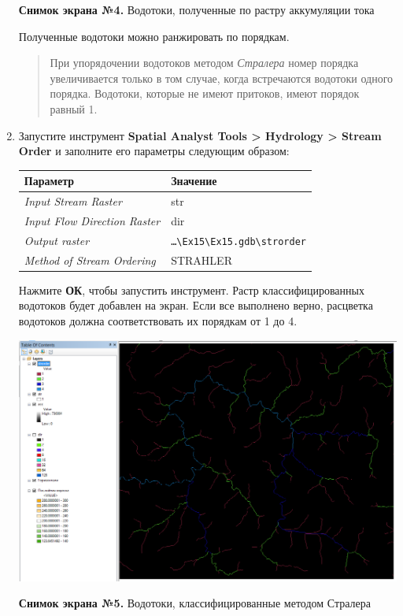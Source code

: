 \documentclass[]{book}
\theoremstyle{definition}
\theoremstyle{definition}
\theoremstyle{definition}
\theoremstyle{remark}
\begin{document}
\begin{enumerate}
  \textbf{Снимок экрана №4.} Водотоки, полученные по растру аккумуляции
  тока

  Полученные водотоки можно ранжировать по порядкам.

  \begin{quote}
  При упорядочении водотоков методом \emph{Стралера} номер порядка
  увеличивается только в том случае, когда встречаются водотоки одного
  порядка. Водотоки, которые не имеют притоков, имеют порядок равный 1.
  \end{quote}
\item
  Запустите инструмент \textbf{Spatial Analyst Tools \textgreater{}
  Hydrology \textgreater{} Stream Order} и заполните его параметры
  следующим образом:

  \begin{longtable}[]{@{}ll@{}}
  \toprule
  Параметр & Значение\tabularnewline
  \midrule
  \endhead
  \emph{Input Stream Raster} & str\tabularnewline
  \emph{Input Flow Direction Raster} & dir\tabularnewline
  \emph{Output raster} &
  \texttt{\ldots{}\textbackslash{}Ex15\textbackslash{}Ex15.gdb\textbackslash{}strorder}\tabularnewline
  \emph{Method of Stream Ordering} & STRAHLER\tabularnewline
  \bottomrule
  \end{longtable}

  Нажмите \textbf{ОК}, чтобы запустить инструмент. Растр
  классифицированных водотоков будет добавлен на экран. Если все
  выполнено верно, расцветка водотоков должна соответствовать их
  порядкам от 1 до 4.

  \includegraphics{images/Ex15/image15.png}

  \textbf{Снимок экрана №5.} Водотоки, классифицированные методом
  Стралера
\end{enumerate}
\end{document}
